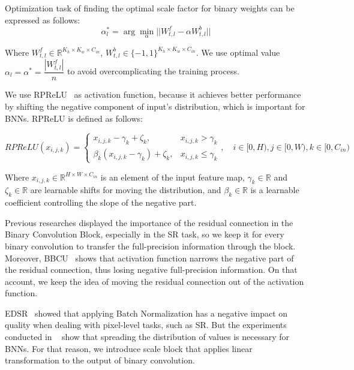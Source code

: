 \documentclass{article}
\begin{document}
Optimization task of finding the optimal scale factor for binary weights can be expressed as follows:
\begin{equation}
    \alpha_l^* = \arg\min\limits_{\alpha} ||W_{t, l}^f - \alpha W_{t, l}^b||
\end{equation}

Where $W_{t, l}^f \in \mathbb{R}^{K_{h} \times K_{w} \times C_{in}}$, $W_{t, l}^b \in \{-1, 1\}^{K_{h} \times K_{w} \times C_{in}}$. We use optimal value $\alpha_l = \alpha^* = \dfrac{|W_{t, l}^f|}{n}$ to avoid overcomplicating the training process.

We use RPReLU~\cite{liu2020reactnet} as activation function, because it achieves better performance by shifting the negative component of input's distribution, which is important for BNNs. RPReLU is defined as follows:

\begin{equation}
    RPReLU(x_{i, j, k}) = 
    \begin{cases}
        x_{i, j, k} - \gamma_{k} + \zeta_{k}, & x_{i, j, k} > \gamma_{k} \\
        \beta_k(x_{i, j, k} - \gamma_k) + \zeta_k, & x_{i, j, k} \le \gamma_k
    \end{cases}, \quad
    i \in [0, H), j \in [0, W), k \in [0, C_{in})
\end{equation}

Where $x_{i, j, k} \in \mathbb{R}^{H \times W \times C_{in}}$ is an element of the input feature map, $\gamma_k \in \mathbb{R}$ and $\zeta_k \in \mathbb{R}$ are learnable shifts for moving the distribution, and $\beta_k \in \mathbb{R}$ is a learnable coefficient controlling the slope of the negative part.

Previous researches displayed the importance of the residual connection in the Binary Convolution Block, especially in the SR task, so we keep it for every binary convolution to transfer the full-precision information through the block. Moreover, BBCU~\cite{xia2022basic} shows that activation function narrows the negative part of the residual connection, thus losing negative full-precision information. On that account, we keep the idea of moving the residual connection out of the activation function.

EDSR~\cite{lim2017enhanced} showed that applying Batch Normalization has a negative impact on quality when dealing with pixel-level tasks, such as SR. But the experiments conducted in ~\cite{xia2022basic} show that spreading the distribution of values is necessary for BNNs. For that reason, we introduce scale block that applies linear transformation to the output of binary convolution.
\end{document}
